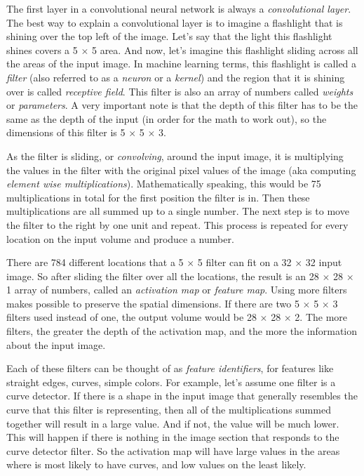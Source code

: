 \documentclass[12pt,a4paper,table,dvipsnames,tikz]{report}
\newcommand{\term}{\textit}
\begin{document}
	The first layer in a convolutional neural network is always a \term{convolutional 
	layer}. The best way to explain a convolutional layer is to imagine a flashlight 
	that is shining over the top left of the image. Let’s say that the light this 
	flashlight shines covers a 5 $\times$ 5 area. And now, let’s imagine this flashlight 
	sliding across all the areas of the input image. In machine learning terms, this 
	flashlight is called a \term{filter} (also referred to as a \term{neuron} or a 
	\term{kernel}) and the region that it is shining over is called \term{receptive 
	field}. This filter is also an array of numbers called \term{weights} or 
	\term{parameters}. A very important note is that the depth of this filter has to 
	be the same as the depth of the input (in order for the math to work out), so the 
	dimensions of this filter is 5 $\times$ 5 $\times$ 3. 
	\par
	As the filter is sliding, or \term{convolving}, around the input image, it is 
	multiplying the values in the filter with the original pixel values of the image 
	(aka computing \term{element wise multiplications}). Mathematically speaking, this 
	would be 75 multiplications in total for the first position the filter is in. Then 
	these multiplications are all summed up to a single number. The next step is to 
	move the filter to the right by one unit and repeat. This process is repeated for 
	every location on the input volume and produce a number.
	\par
	There are 784 different locations that a 5 $\times$ 5 filter can fit on a 
	32 $\times$ 32 input image. So after sliding the filter over all the locations, 
	the result is an 28 $\times$ 28 $\times$ 1 array of numbers, called an \term{activation 
	map} or \term{feature map}. Using more filters makes possible to preserve the spatial 
	dimensions. If there are two 5 $\times$ 5 $\times$ 3 filters used instead of one, 
	the output volume would be 28 $\times$ 28 $\times$ 2. The more filters, the greater 
	the depth of the activation map, and the more the information about the input image.
	\par
	Each of these filters can be thought of as \term{feature identifiers}, for features 
	like straight edges, curves, simple colors. For example, let's assume one filter 
	is a curve detector. If there is a shape in the input image that generally resembles 
	the curve that this filter is representing, then all of the multiplications summed 
	together will result in a large value. And if not, the value will be much lower. 
	This will happen if there is nothing in the image section that responds to the 
	curve detector filter. So the activation map will have large values in the areas 
	where is most likely to have curves, and low values on the least likely.
	\\
	
\end{document}
